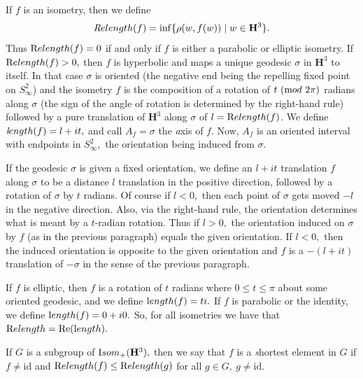  \begin{definition}\label{GMT 1.2}
 If $f$ is an isometry, then we define
$${\textit Relength}(f)=\inf\{\rho(w,f(w))\mid w\in \mathbf {H}^3\}.$$
Thus ${\textrm Relength}(f)=0$ if and only if $f$ is either a parabolic or elliptic
isometry.  If ${\textrm Relength}(f) > 0,$ then $f$
is hyperbolic and maps a unique geodesic $\sigma$ in $\mathbf {H}^3$ to itself. In that case
$\sigma$ is oriented (the negative end
being the repelling fixed point on $S^2_\infty$)  and the isometry $f$ is the
composition of a  rotation of $t \ ({\textrm mod}\ 2\pi)$
radians along $\sigma$ (the sign of the angle of rotation is determined by the right-hand rule) followed by a pure translation of $\mathbf {H}^3$ along $\sigma$ of
$l = {\textrm Relength}(f)$.  We define
${\textit length}(f)=l+it,$ and call $A_f = \sigma$ the {\textit axis} of $f.$  Now,  $A_f$ is an oriented interval with endpoints in $S^2_{\infty},$ the
orientation being induced from $\sigma.$

If the geodesic $\sigma$ is  given a fixed orientation, we define an $l+it$
translation $f$ along $\sigma$  to be a distance $l$ translation in the positive
direction, followed by a rotation of $\sigma$ by $t$ radians.  Of course if
$l < 0,$ then each point of $\sigma$ gets moved $-l$ in the negative direction.
Also, via the right-hand rule, the orientation determines what is meant
by a $t$-radian rotation.  Thus if $l > 0,$ the orientation induced on
$\sigma$ by $f$ (as in the previous paragraph) equals the given orientation.
If $l < 0,$ then the induced orientation is opposite to the given orientation
and $f$ is a $-(l+it)$ translation of $-\sigma$ in the sense of the previous
paragraph.

If $f$ is elliptic, then $f$ is a rotation of $t$ radians where 
$0 \le t \le \pi$ about some oriented geodesic, and we define ${\textrm length}(f) = t i.$ 
If $f$ is parabolic or the identity, we define ${\textrm length}(f) = 0 + i0.$
So, for all isometries we have that ${\textrm Relength} = \mathrm {Re}({\textrm length}).$
\end{definition}

\begin{definition} \label{GMT 1.3}  If
$G$ is a subgroup of ${\textrm Isom}_+(\mathbf {H}^3),$ then  we say that $f$ is a {\textit shortest} element  in $G$ if $f\neq \mathrm {id}$ and
${\textrm Relength}(f)\le {\textrm Relength}(g)$
for all $g\in G, \ g\neq \mathrm {id}.$
\end{definition}
 
